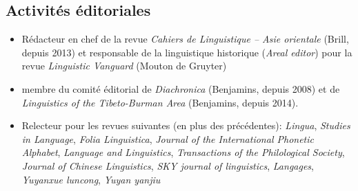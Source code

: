 \documentclass[oldfontcommands,oneside,a4paper,11pt]{article}
\begin{document}
\subsection{Activités éditoriales}
\begin{itemize}
\item Rédacteur en chef de la revue \textit{Cahiers de Linguistique -- Asie orientale} (Brill, depuis 2013) et responsable de la linguistique historique (\textit{Areal editor}) pour la revue \textit{Linguistic Vanguard} (Mouton de Gruyter)
\item membre du comité éditorial de \textit{Diachronica} (Benjamins, depuis 2008) et de \textit{Linguistics of the Tibeto-Burman Area}  (Benjamins, depuis 2014).
\item Relecteur pour les revues suivantes (en plus des précédentes): \textit{Lingua}, \textit{Studies in Language}, \textit{Folia Linguistica}, \textit{Journal of the International Phonetic Alphabet},  \textit{Language and Linguistics}, \textit{Transactions of the Philological Society}, \textit{Journal of Chinese Linguistics}, \textit{SKY journal of linguistics}, \textit{Langages}, \textit{Yuyanxue luncong}, \textit{Yuyan yanjiu}
\end{itemize}
\end{document}
